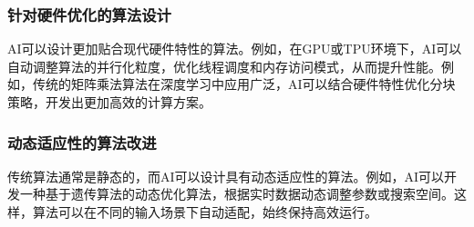 \documentclass[supercite]{HustGraduPaper}
\begin{document}
	\subsubsection{\songti \bfseries 针对硬件优化的算法设计}
	AI可以设计更加贴合现代硬件特性的算法。例如，在GPU或TPU环境下，AI可以自动调整算法的并行化粒度，优化线程调度和内存访问模式，从而提升性能。例如，传统的矩阵乘法算法在深度学习中应用广泛，AI可以结合硬件特性优化分块策略，开发出更加高效的计算方案。
	\subsubsection{\songti \bfseries 动态适应性的算法改进}
	传统算法通常是静态的，而AI可以设计具有动态适应性的算法。例如，AI可以开发一种基于遗传算法的动态优化算法，根据实时数据动态调整参数或搜索空间。这样，算法可以在不同的输入场景下自动适配，始终保持高效运行。


	
	
	
	
	
	
	
	
	
	
	
\end{document}
